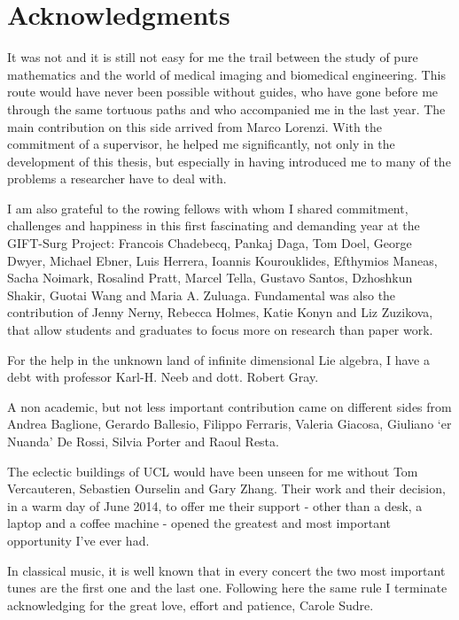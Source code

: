 \section*{Acknowledgments}

It was not and it is still not easy for me the trail between the study of pure mathematics and the world of medical imaging and biomedical engineering. This route would have never been possible without guides, who have gone before me through the same tortuous paths and who accompanied me in the last year. The main contribution on this side arrived from Marco Lorenzi. With the commitment of a supervisor, he helped me significantly, not only in the development of this thesis, but especially in having introduced me to many of the problems a researcher have to deal with.

I am also grateful to the rowing fellows with whom I shared commitment, challenges and happiness in this first fascinating and demanding year at the GIFT-Surg Project: 
Francois Chadebecq, 
Pankaj Daga, 
Tom Doel, 
George Dwyer,
Michael Ebner,
Luis Herrera,
Ioannis Kourouklides,
Efthymios Maneas,
Sacha Noimark,
Rosalind Pratt,
Marcel Tella,
Gustavo Santos,
Dzhoshkun Shakir,
Guotai Wang and Maria A. Zuluaga.
Fundamental was also the contribution of Jenny Nerny, Rebecca Holmes, Katie Konyn and Liz Zuzikova, that allow students and graduates to focus more on research than paper work.

For the help in the unknown land of infinite dimensional Lie algebra, I have a debt with professor Karl-H. Neeb and dott. Robert Gray.

A non academic, but not less important contribution came on different sides from Andrea Baglione, Gerardo Ballesio, Filippo Ferraris, Valeria Giacosa, Giuliano `er Nuanda' De Rossi, Silvia Porter and Raoul Resta. 

The eclectic buildings of UCL would have been unseen for me without Tom Vercauteren, Sebastien Ourselin and Gary Zhang. Their work and their decision, in a warm day of June 2014, to offer me their support - other than a desk, a laptop and a coffee machine - opened the greatest and most important opportunity I've ever had.
 
In classical music, it is well known that in every concert the two most important tunes are the first one and the last one. Following here the same rule I terminate acknowledging for the great love, effort and patience, Carole Sudre.





\qquad
\pagestyle{empty}
\newpage
